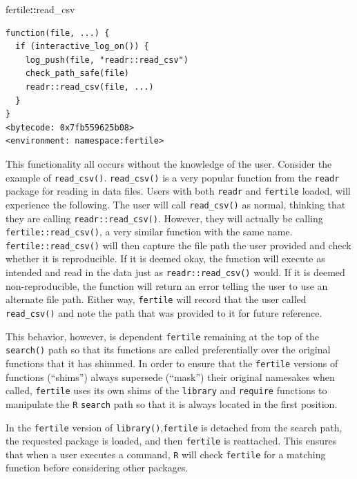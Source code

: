 \documentclass[12pt,twoside]{reedthesis}
\newenvironment{Shaded}{\begin{snugshade}}{\end{snugshade}}
\newcommand{\OperatorTok}[1]{\textcolor[rgb]{0.81,0.36,0.00}{\textbf{#1}}}
\newcommand{\NormalTok}[1]{#1}
\begin{document}
\footnotesize
\begin{Shaded}
\begin{Highlighting}[]
\NormalTok{fertile}\OperatorTok{::}\NormalTok{read_csv}
\end{Highlighting}
\end{Shaded}
\begin{verbatim}
function(file, ...) {
  if (interactive_log_on()) {
    log_push(file, "readr::read_csv")
    check_path_safe(file)
    readr::read_csv(file, ...)
  }
}
<bytecode: 0x7fb559625b08>
<environment: namespace:fertile>
\end{verbatim}
\normalsize

This functionality all occurs without the knowledge of the user.
Consider the example of \texttt{read\_csv()}. \texttt{read\_csv()} is a
very popular function from the \texttt{readr} package for reading in
data files. Users with both \texttt{readr} and \texttt{fertile} loaded,
will experience the following. The user will call \texttt{read\_csv()}
as normal, thinking that they are calling \texttt{readr::read\_csv()}.
However, they will actually be calling \texttt{fertile::read\_csv()}, a
very similar function with the same name. \texttt{fertile::read\_csv()}
will then capture the file path the user provided and check whether it
is reproducible. If it is deemed okay, the function will execute as
intended and read in the data just as \texttt{readr::read\_csv()} would.
If it is deemed non-reproducible, the function will return an error
telling the user to use an alternate file path. Either way,
\texttt{fertile} will record that the user called \texttt{read\_csv()}
and note the path that was provided to it for future reference.

This behavior, however, is dependent \texttt{fertile} remaining at the
top of the \texttt{search()} path so that its functions are called
preferentially over the original functions that it has shimmed. In order
to ensure that the \texttt{fertile} versions of functions (``shims'')
always supersede (``mask'') their original namesakes when called,
\texttt{fertile} uses its own shims of the \texttt{library} and
\texttt{require} functions to manipulate the \texttt{R} \texttt{search}
path so that it is always located in the first position.

In the \texttt{fertile} version of \texttt{library()},\texttt{fertile}
is detached from the search path, the requested package is loaded, and
then \texttt{fertile} is reattached. This ensures that when a user
executes a command, \texttt{R} will check \texttt{fertile} for a
matching function before considering other packages.
\end{document}
